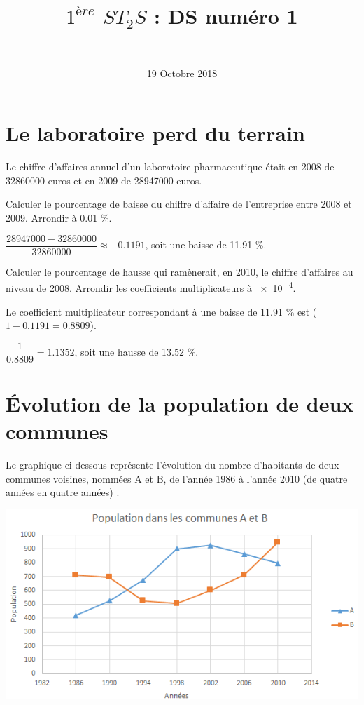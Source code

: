 \documentclass[a4paper,11pt]{exam}
\author{\ }
\date{19 Octobre 2018}
\title{$1^{ère}$ $ST_2S$ : DS num\'ero 1}
\begin{document}
%	

	\maketitle


\section{Le laboratoire perd du terrain}

Le chiffre d'affaires annuel d'un laboratoire pharmaceutique était en 2008 de \num{32860000} euros et en 2009 de \num{28947000} euros.
\begin{questions}
	\question Calculer le pourcentage de baisse du chiffre d'affaire de l'entreprise entre 2008 et 2009. Arrondir à \num{0.01} \%.
	\begin{solution}
		$\dfrac{\num{28947000} - \num{32860000}}{\num{32860000}} \approx \num{-0.1191}$, soit une baisse de \num{11.91} \%.
	\end{solution}
	
	\question Calculer le pourcentage de hausse qui ramènerait, en 2010, le chiffre d'affaires au niveau de 2008. Arrondir les coefficients multiplicateurs à \num{e-4}.
	\begin{solution}
		Le coefficient multiplicateur correspondant à une baisse de \num{11.91} \% est ($1-\num{0.1191} = \num{0.8809}$).
		
		$\dfrac{1}{\num{0.8809}} = \num{1.1352}$, soit une hausse de \num{13.52} \%.
	\end{solution}
\end{questions}


\section{\'Evolution de la population de deux communes}


Le graphique ci-dessous représente l'évolution du nombre d'habitants de deux communes voisines, nommées A et B, de l'année 1986 à l'année 2010 (de quatre années en quatre années) .

\begin{center}
	\includegraphics[scale=0.7]{./graph}
\end{center}
\end{document}
